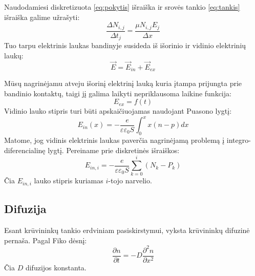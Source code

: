 Naudodamiesi diskretizuota \eqref{eq:pokytis} išraiška ir srovės tankio \eqref{eq:tankis} išraiška galime užrašyti:
\begin{equation}
\frac{\Delta N_{i,j}}{\Delta t_j} = \frac{\mu N_{i,j} E_j}{\Delta x}
\end{equation}
Tuo tarpu elektrinis laukas bandinyje susideda iš išorinio ir vidinio elektrinių laukų:
\begin{equation}
\vec{E} = \vec{E}_{in} + \vec{E}_{ex}
\end{equation}

Mūsų nagrinėjamu atveju išorinį elektrinį lauką kuria įtampa prijungta prie bandinio kontaktų, taigi jį galima laikyti nepriklausoma laikine funkcija:
\begin{equation}
	E_{ex}=f(t)
\end{equation}
Vidinio lauko stipris turi būti apskaičiuojamas naudojant Puasono lygtį:
\begin{equation}
	E_{in}(x)=-\frac{e}{\varepsilon \varepsilon_0 S} \int_{0}^{x} x(n-p)dx
\end{equation}
Matome, jog vidinis elektrinis laukas paverčia nagrinėjamą problemą į integro-diferencialinę lygtį.
Pereiname prie diskretinės išraiškos:
\begin{equation}
	E_{in,i}=-\frac{e}{\varepsilon \varepsilon_0 S } \sum_{k=0}^{i}(N_k-P_k)
\end{equation}
Čia \(E_{in,i}\) lauko stipris kuriamas \(i\)-tojo narvelio.



\subsection{Difuzija}

Esant krūvininkų tankio erdviniam pasiskirstymui, vyksta krūvininkų difuzinė pernaša. Pagal Fiko dėsnį:
\begin{equation}
	\frac{\partial n}{\partial t}=-D \frac{\partial^2 n}{\partial x^2}
\end{equation}
Čia \(D\) difuzijos konstanta.

